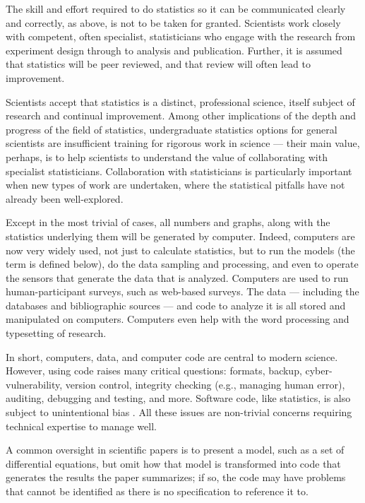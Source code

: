 \documentclass[10pt,letterpaper]{article}
\begin{document}
The skill and effort required to do statistics so it can be communicated clearly and correctly, as above, is not to be taken for granted. Scientists work closely with competent, often specialist, statisticians who engage with the research from experiment design through to analysis and publication. Further, it is assumed that statistics will be peer reviewed, and that review will often lead to improvement. 

Scientists accept that statistics is a distinct, professional science, itself subject of research and continual improvement. Among other implications of the depth and progress of the field of statistics, undergraduate statistics options for general scientists are insufficient training for rigorous work in science --- their main value, perhaps, is to help scientists to understand the value of collaborating with specialist statisticians. Collaboration with statisticians is particularly important when new types of work are undertaken, where the statistical pitfalls have not already been well-explored.

Except in the most trivial of cases, all numbers and graphs, along with the statistics underlying them will be generated by computer. Indeed, computers are now very widely used, not just to calculate statistics, but to run the models (the term is defined below), do the data sampling and processing, and even to operate the sensors that generate the data that is analyzed. Computers are used to run human-participant surveys, such as web-based surveys. The data --- including the databases and bibliographic sources --- and code to analyze it is all stored and manipulated on computers. Computers even help with the word processing and typesetting of research.

In short, computers, data, and computer code are central to modern science. However, using code raises many critical questions: formats, backup, cyber-vulnerability, version control, integrity checking (e.g., managing human error), auditing, debugging and testing, and more. Software code, like statistics, is also subject to unintentional bias \cite{Ben,se-bias}.  All these issues are non-trivial concerns requiring technical expertise to manage well. 

A common oversight in scientific papers is to present a model, such as a set of differential equations, but omit how that model is transformed into code that generates the results the paper summarizes; if so, the code may have problems that cannot be identified as there is no specification to reference it to.
\end{document}
